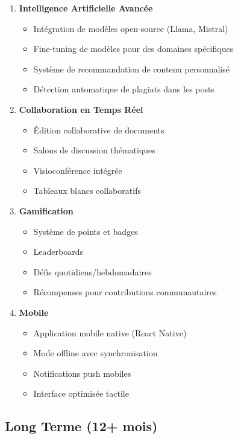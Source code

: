 \begin{enumerate}
    \item \textbf{Intelligence Artificielle Avancée}
    \begin{itemize}
        \item Intégration de modèles open-source (Llama, Mistral)
        \item Fine-tuning de modèles pour des domaines spécifiques
        \item Système de recommandation de contenu personnalisé
        \item Détection automatique de plagiats dans les posts
    \end{itemize}
    
    \item \textbf{Collaboration en Temps Réel}
    \begin{itemize}
        \item Édition collaborative de documents
        \item Salons de discussion thématiques
        \item Visioconférence intégrée
        \item Tableaux blancs collaboratifs
    \end{itemize}
    
    \item \textbf{Gamification}
    \begin{itemize}
        \item Système de points et badges
        \item Leaderboards
        \item Défis quotidiens/hebdomadaires
        \item Récompenses pour contributions communautaires
    \end{itemize}
    
    \item \textbf{Mobile}
    \begin{itemize}
        \item Application mobile native (React Native)
        \item Mode offline avec synchronisation
        \item Notifications push mobiles
        \item Interface optimisée tactile
    \end{itemize}
\end{enumerate}

\subsection*{Long Terme (12+ mois)}

